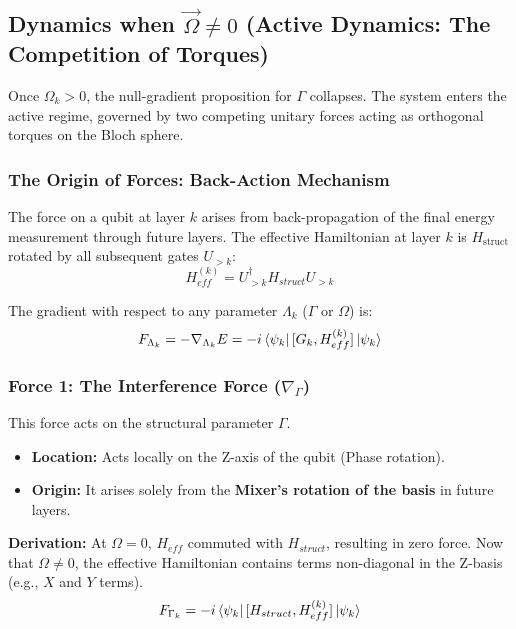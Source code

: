 \documentclass[12pt, a4paper, oneside]{report}
\begin{document}
\subsection{Dynamics when $\vec{\Omega} \neq 0$ (Active Dynamics: The Competition of Torques)}

Once $\Omega_k > 0$, the null-gradient proposition for $\Gamma$ collapses. The system enters the active regime, governed by two competing unitary forces acting as orthogonal torques on the Bloch sphere.

\subsubsection{The Origin of Forces: Back-Action Mechanism}
The force on a qubit at layer $k$ arises from back-propagation of the final energy measurement through future layers. The effective Hamiltonian at layer $k$ is $H_{\text{struct}}$ rotated by all subsequent gates $U_{>k}$:
\begin{equation}
    H_{eff}^{(k)} = U_{>k}^\dagger H_{struct} U_{>k}
\end{equation}

The gradient with respect to any parameter $\Lambda_k$ ($\Gamma$ or $\Omega$) is:
\begin{equation}
    F_{\Lambda_k} = -\nabla_{\Lambda_k} E = -i \bra{\psi_{k}} [G_k, H_{eff}^{(k)}] \ket{\psi_{k}}
\end{equation}

\subsubsection{Force 1: The Interference Force ($\nabla_\Gamma$)}
This force acts on the structural parameter $\Gamma$.
\begin{itemize}
    \item \textbf{Location:} Acts locally on the Z-axis of the qubit (Phase rotation).
    \item \textbf{Origin:} It arises solely from the \textbf{Mixer's rotation of the basis} in future layers.
\end{itemize}

\textbf{Derivation:}
At $\Omega=0$, $H_{eff}$ commuted with $H_{struct}$, resulting in zero force. Now that $\Omega \neq 0$, the effective Hamiltonian contains terms non-diagonal in the Z-basis (e.g., $X$ and $Y$ terms).
\begin{equation}
    F_{\Gamma_k} = -i \bra{\psi_{k}} [H_{struct}, H_{eff}^{(k)}] \ket{\psi_{k}}
\end{equation}
\end{document}
